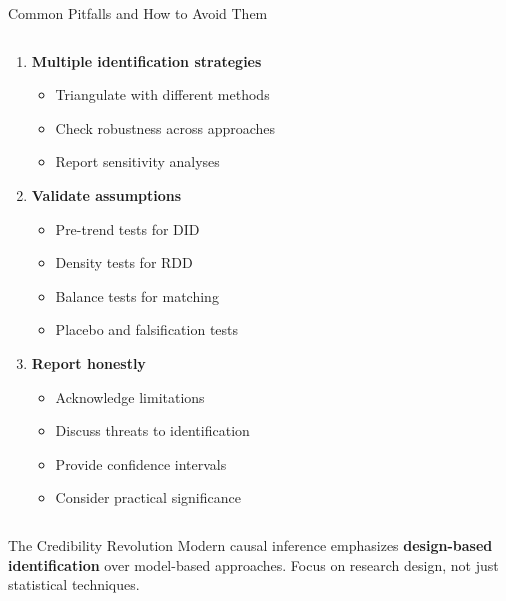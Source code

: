 \documentclass[aspectratio=169,11pt]{beamer}
\begin{document}
\begin{frame}{Common Pitfalls and How to Avoid Them}
\begin{columns}
\begin{column}{0.5\textwidth}
\begin{enumerate}
\item \textbf{Multiple identification strategies}
   \begin{itemize}
   \item Triangulate with different methods
   \item Check robustness across approaches
   \item Report sensitivity analyses
   \end{itemize}

\item \textbf{Validate assumptions}
   \begin{itemize}
   \item Pre-trend tests for DID
   \item Density tests for RDD
   \item Balance tests for matching
   \item Placebo and falsification tests
   \end{itemize}

\item \textbf{Report honestly}
   \begin{itemize}
   \item Acknowledge limitations
   \item Discuss threats to identification
   \item Provide confidence intervals
   \item Consider practical significance
   \end{itemize}
\end{enumerate}
\end{column}
\end{columns}

\begin{alertblock}{The Credibility Revolution}
Modern causal inference emphasizes \textbf{design-based identification} over model-based approaches. Focus on research design, not just statistical techniques.
\end{alertblock}
\end{frame}
\end{document}

